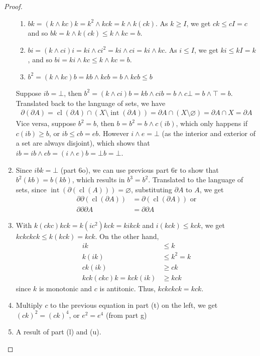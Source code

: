 \documentclass{treatise}
\begin{document}
\begin{proof}
\begin{enumerate}[label=(\alph*)]
    \begin{enumerate}
        \item $bk = (k \wedge kc)k = k^2 \wedge kck = k \wedge k(ck)$. As $k \geq I$, we get $ck \leq cI = c$ and so $bk = k \wedge k(ck) \leq k \wedge kc = b$.
        \item $bi = (k \wedge ci)i = ki \wedge ci^2 = ki \wedge ci = ki \wedge kc$. As $i \leq I$, we get $ki \leq kI = k$, and so $bi = ki \wedge kc \leq k \wedge kc = b$.
        \item $b^2 = (k \wedge kc) b = kb \wedge kcb = b \wedge kcb \leq b$
    \end{enumerate}
    Suppose $ib = \bot$, then $b^2 = (k \wedge ci)b = kb \wedge cib = b \wedge c\bot = b \wedge \top = b$. Translated back to the language of sets, we have
    \begin{align*}
        \partial (\partial A) = \operatorname{cl}(\partial A) \cap (X \setminus \operatorname{int}(\partial A)) = \partial A \cap (X \setminus \varnothing) = \partial A \cap X = \partial A
    \end{align*}
    Vice versa, suppose $b^2 = b$, then $b = b^2 = b \wedge c(ib)$, which only happens if $c(ib) \geq b$, or $ib \leq cb = eb$. However $i \wedge e = \bot$ (as the interior and exterior of a set are always disjoint), which shows that $ib = ib \wedge eb = (i \wedge e)b = \bot b = \bot$.
    \item Since $ibk = \bot$ (part 6o), we can use previous part 6r to show that $b^2 (kb) = b (kb)$, which results in $b^3 = b^2$. Translated to the language of sets, since $\operatorname{int}(\partial (\operatorname{cl}(A))) = \varnothing$, substituting $\partial A$ to $A$, we get
    \begin{align*}
        \partial \partial (\operatorname{cl}(\partial A)) & = \partial (\operatorname{cl}(\partial A)) \mbox{ or}
        \\
        \partial \partial \partial A & = \partial \partial A
    \end{align*}
    \item With $k(ckc)kck = k(ic^2)kck = kikck$ and $i(kck) \leq kck$, we get $kckckck \leq k(kck) = kck$. On the other hand,
    \begin{align*}
        ik & \leq k
        \\
        k(ik) & \leq k^2 = k
        \\
        ck(ik) & \geq ck
        \\
        kck(ckc)k = kck(ik) & \geq kck
    \end{align*}
    since $k$ is monotonic and $c$ is antitonic. Thus, $kckckck = kck$.
    \item Multiply $c$ to the previous equation in part (t) on the left, we get $(ck)^2 = (ck)^4$, or $e^2 = e^4$ (from part g)
    \item A result of part (l) and (u).
\end{enumerate}
\end{proof}
\end{document}
